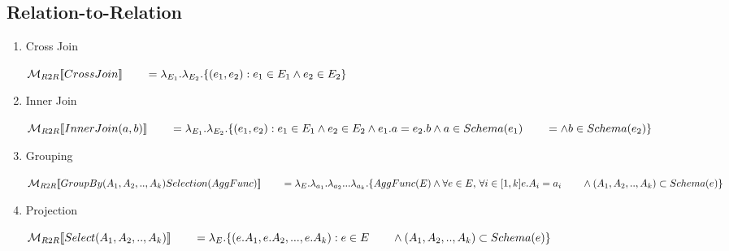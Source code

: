 \subsection*{Relation-to-Relation}
\begin{enumerate}
		
	\item Cross Join
	
	$\mathcal{M}_{R2R}[\![CrossJoin]\!] \\
		{}\qquad= \lambda_{E_1}.\lambda_{E_2}.\{(e_1,e_2) : e_1 \in E_1 \land e_2 \in E_2 \}$
		
	\item Inner Join
	
	$\mathcal{M}_{R2R}[\![InnerJoin(a,b)]\!] \\
		{}\qquad= \lambda_{E_1}.\lambda_{E_2}.\{(e_1,e_2) : e_1 \in E_1 \land e_2 \in E_2 \land e_1.a = e_2.b \land a \in Schema(e_1) \\
		{}\qquad= \land b \in Schema(e_2) \}$
		
	\item Grouping
	
		$\mathcal{M}_{R2R}[\![GroupBy(A_1,A_2,..,A_k) Selection(AggFunc)]\!] \\
		{}\qquad= \lambda_E.\lambda_{a_1}.\lambda_{a_2}...\lambda_{a_k}.\{AggFunc(E)  \land  \forall e \in E, \,\forall i \in [1,k] e.A_i= a_i \, \\
		{}\qquad\land (A_1,A_2,..,A_k) \subset Schema(e) \}$ 
	
	\item Projection
	
		$\mathcal{M}_{R2R}[\![Select(A_1,A_2,..,A_k)]\!] \\
		{}\qquad= \lambda_E.\{(e.A_1,e.A_2,...,e.A_k):e \in E \\
		{}\qquad\land (A_1,A_2,..,A_k) \subset Schema(e) \}$
	
\end{enumerate}


